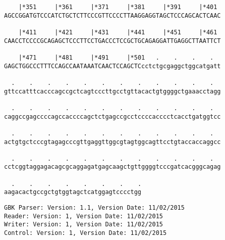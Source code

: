 \documentclass{article}
\begin{document}
\begin{Verbatim}
    |*351     |*361     |*371     |*381     |*391     |*401 
AGCCGGATGTCCCATCTGCTCTTCCCGTTCCCCTTAAGGAGGTAGCTCCCAGCACTCAAC
  
    |*411     |*421     |*431     |*441     |*451     |*461 
CAACCTCCCCGCAGAGCTCCCTTCCTGACCCTCCGCTGCAGAGGATTGAGGCTTAATTCT
  
    |*471     |*481     |*491     |*501   .    .    .    .  
GAGCTGGCCCTTTCCAGCCAATAAATCAACTCCAGCTCcctctgcgaggctggcatgatt
  
  .    .    .    .    .    .    .    .    .    .    .    .  
gttccatttcacccagccgctcagtcccttgcctgttacactgtggggctgaaacctagg
  
  .    .    .    .    .    .    .    .    .    .    .    .  
caggccgagccccagccaccccagctctgagccgcctccccacccctcacctgatggtcc
  
  .    .    .    .    .    .    .    .    .    .    .    .  
actgtgctcccgtagagcccgttgaggttggcgtagtggcagttcctgtaccaccaggcc
  
  .    .    .    .    .    .    .    .    .    .    .    .  
cctcggtaggagacagcgcaggagatgagcaagctgttggggtcccgatcacgggcagag
  
  .    .    .    .    .    .    .    .
aagacactgccgctgtggtagctcatggagtcccctgg
\end{Verbatim}
\newpage
\begin{Verbatim}
GBK Parser: Version: 1.1, Version Date: 11/02/2015
Reader: Version: 1, Version Date: 11/02/2015
Writer: Version: 1, Version Date: 11/02/2015
Control: Version: 1, Version Date: 11/02/2015
\end{Verbatim}
\end{document}
